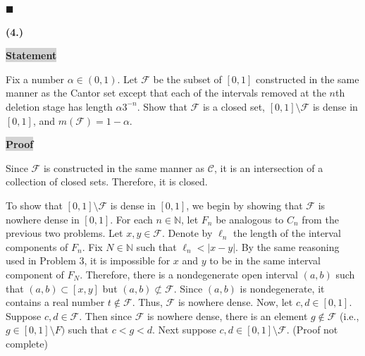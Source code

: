 \documentclass[12pt]{article}
\newcommand{\mybox}{%
    \collectbox{%
        \setlength{\fboxsep}{2pt}%
        \fbox{\BOXCONTENT}%
    }%
}
\begin{document}
\hfill$\blacksquare$

\pagebreak

\noindent \textbf{(4.)}

\vspace{3mm}

\noindent\mybox{\colorbox{lightgray}{\textbf{Statement}}}\hspace{3mm}\hrulefill

\noindent Fix a number $\alpha\in(0,1)$. Let $\mathcal{F}$ be the subset of $[0,1]$ constructed in the same manner as the Cantor set except that each of the intervals removed at the $n$th deletion stage has length $\alpha3^{-n}$. Show that $\mathcal{F}$ is a closed set, $[0,1]\setminus \mathcal{F}$ is dense in $[0,1]$, and $m(\mathcal{F}) = 1 - \alpha$.

\vspace{5mm}

\noindent\mybox{\colorbox{lightgray}{\textbf{Proof}}}\hspace{3mm}\hrulefill

\noindent Since $\mathcal{F}$ is constructed in the same manner as $\mathcal{C}$, it is an intersection of a collection of closed sets. Therefore, it is closed. 

\vspace{3mm}

\noindent To show that $[0,1]\setminus \mathcal{F}$ is dense in $[0,1]$, we begin by showing that $\mathcal{F}$ is nowhere dense in $[0,1]$. For each $n\in\mathbb{N}$, let $F_n$ be analogous to $C_n$ from the previous two problems. Let $x,y\in\mathcal{F}$. Denote by $\ell_n$ the length of the interval components of $F_n$. Fix $N\in\mathbb{N}$ such that $\ell_n < |x-y|.$ By the same reasoning used in Problem 3, it is impossible for $x$ and $y$ to be in the same interval component of $F_N$. Therefore, there is a nondegenerate open interval $(a,b)$ such that $(a,b)\subset[x,y]$ but $(a,b)\not\subset\mathcal{F}.$ Since $(a,b)$ is nondegenerate, it contains a real number $t\not\in\mathcal{F}.$ Thus, $\mathcal{F}$ is nowhere dense. Now, let $c,d\in[0,1]$. Suppose $c,d\in\mathcal{F}$. Then since $\mathcal{F}$ is nowhere dense, there is an element $g\not\in\mathcal{F}$ (i.e., $g\in[0,1]\setminus{F})$ such that $c<g<d$. Next suppose $c,d\in[0,1]\setminus\mathcal{F}$. (Proof not complete)

\vspace{3mm}
\end{document}
